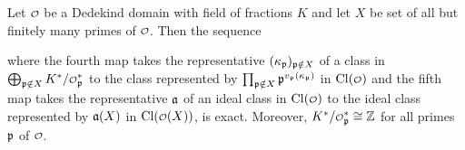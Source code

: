      \begin{proposition}\label{prop:ideal_class_group_localization_exact_sequence}
      Let $\smc{O}$ be a Dedekind domain with field of fractions $K$ and let $X$ be set of all but finitely many primes of $\smc{O}$. Then the sequence

      \begin{center}
      \end{center}

      where the fourth map takes the representative $(\kappa_{\mathfrak{p}})_{\mathfrak{p} \notin X}$ of a class in $\bigop_{\mf{p} \notin X}K^{\ast}/\smc{O}_{\mf{p}}^{\ast}$ to the class represented by $\prod_{\mathfrak{p} \notin X}\mathfrak{p}^{v_{\mathfrak{p}}(\kappa_{\mathfrak{p}})}$ in $\Cl(\smc{O})$ and the fifth map takes the representative $\mathfrak{a}$ of an ideal class in $\Cl(\smc{O})$ to the ideal class represented by $\mathfrak{a}(X)$ in $\Cl(\smc{O}(X))$, is exact. Moreover, $K^{\ast}/\smc{O}_{\mf{p}}^{\ast} \cong \Z$ for all primes $\mathfrak{p}$ of $\smc{O}$.
    \end{proposition}
